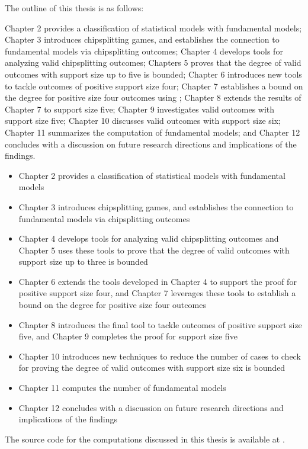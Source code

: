 The outline of this thesis is as follows: 


Chapter 2 provides a classification of statistical models with fundamental models;  Chapter 3 introduces chipsplitting games, and establishes the connection to fundamental models via chipsplitting outcomes; Chapter 4 develops tools for analyzing valid chipsplitting outcomes; Chapters 5 proves that the degree of valid outcomes with support size up to five is bounded; Chapter 6 introduces new tools to tackle outcomes of positive support size four; Chapter 7 establishes a bound on the degree for positive size four outcomes using ; Chapter 8 extends the results of Chapter 7 to support size five; Chapter 9 investigates valid outcomes with support size five; Chapter 10 discusses valid outcomes with support size six; Chapter 11 summarizes the computation of fundamental models; and Chapter 12 concludes with a discussion on future research directions and implications of the findings.

\begin{itemize}
    \item Chapter 2 provides a classification of statistical models with fundamental models
    \item Chapter 3 introduces chipsplitting games, and establishes the connection to fundamental models via chipsplitting outcomes
    \item Chapter 4 develops tools for analyzing valid chipsplitting outcomes and Chapter 5 uses these tools to prove that the degree of valid outcomes with support size up to three is bounded
    \item Chapter 6 extends the tools developed in Chapter 4 to support the proof for positive support size four, and Chapter 7 leverages these tools to establish a bound on the degree for positive size four outcomes
    \item Chapter 8 introduces the final tool to tackle outcomes of positive support size five, and Chapter 9 completes the proof for support size five
    \item Chapter 10 introduces new techniques to reduce the number of cases to check for proving the degree of valid outcomes with support size six is bounded
    \item Chapter 11 computes the number of fundamental models 
    \item Chapter 12 concludes with a discussion on future research directions and implications of the findings
\end{itemize}


The source code for the computations discussed in this thesis is available at \cite{ducrepo}.
